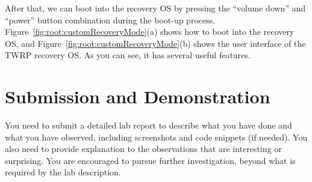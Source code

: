 After that, we can boot into the recovery OS by 
pressing the ``volume down'' and ``power'' button combination during the boot-up process. 
Figure~\ref{fig:root:customRecoveryMode}(a) shows how to boot into the recovery OS, and 
Figure~\ref{fig:root:customRecoveryMode}(b) shows the user interface of the TWRP recovery OS.
As you can see, it has several useful features. 



\section{Submission and Demonstration}

You need to submit a detailed lab report to describe what you have done and
what you have observed, including screenshots and code snippets (if
needed). You also need to provide explanation to the observations that are
interesting or surprising. You are encouraged to pursue further
investigation, beyond what is required by the lab description.




